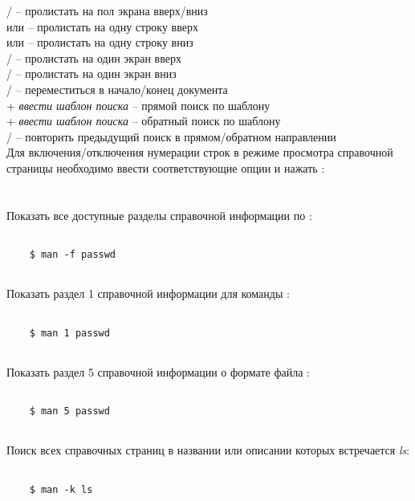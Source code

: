 \noindent{} /  -- пролистать на пол экрана вверх/вниз \\
 или \keys{ \arrowkeyup } -- пролистать на одну строку вверх \\
 или \keys{ \arrowkeydown } -- пролистать на одну строку вниз \\
 /  -- пролистать на один экран вверх\\
 /  -- пролистать на один экран вниз\\
 /   -- переместиться в начало/конец документа \\

\noindent\keys{ / } + \textit{ввести шаблон поиска} -- прямой поиск по шаблону\\
 + \textit{ввести шаблон поиска} -- обратный поиск по шаблону\\
 /  -- повторить предыдущий поиск в прямом/обратном направлении\\

Для включения/отключения нумерации строк в режиме просмотра справочной страницы необходимо ввести соответствующие опции и нажать :\\ 
\noindent
{}\\
\\

Показать все доступные разделы справочной информации по :
\begin{lstlisting}
	
	$ man -f passwd
	
\end{lstlisting}	


Показать раздел 1 справочной информации для команды :
\begin{lstlisting}
	
	$ man 1 passwd
	
\end{lstlisting}	

Показать раздел 5 справочной информации о формате файла :
\begin{lstlisting}
	
	$ man 5 passwd
	
\end{lstlisting}	

Поиск всех справочных страниц в названии или описании которых встречается \textit{ls}:
\begin{lstlisting}
	
	$ man -k ls
	
\end{lstlisting}	

